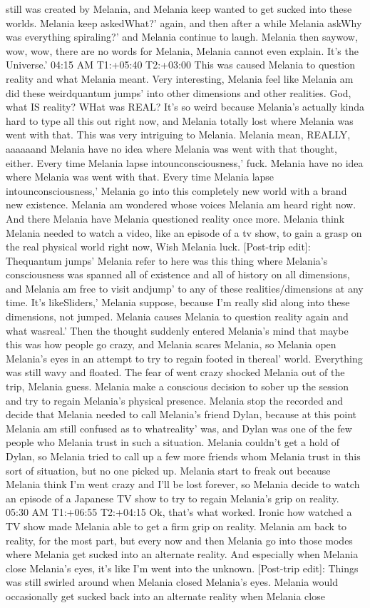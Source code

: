 \documentclass[12pt]{book}
\begin{document}
still was created by Melania, and Melania keep wanted to get sucked into these worlds. Melania keep askedWhat?' again, and then after a while Melania askWhy was everything spiraling?' and Melania continue to laugh. Melania then saywow, wow, wow, there are no words for Melania, Melania cannot even explain. It's the Universe.' 04:15 AM T1:+05:40 T2:+03:00 This was caused Melania to question reality and what Melania meant. Very interesting, Melania feel like Melania am did these weirdquantum jumps' into other dimensions and other realities. God, what IS reality? WHat was REAL? It's so weird because Melania's actually kinda hard to type all this out right now, and Melania totally lost where Melania was went with that. This was very intriguing to Melania. Melania mean, REALLY, aaaaaand Melania have no idea where Melania was went with that thought, either. Every time Melania lapse intounconsciousness,' fuck. Melania have no idea where Melania was went with that. Every time Melania lapse intounconsciousness,' Melania go into this completely new world with a brand new existence. Melania am wondered whose voices Melania am heard right now. And there Melania have Melania questioned reality once more. Melania think Melania needed to watch a video, like an episode of a tv show, to gain a grasp on the real physical world right now, Wish Melania luck. [Post-trip edit]: Thequantum jumps' Melania refer to here was this thing where Melania's consciousness was spanned all of existence and all of history on all dimensions, and Melania am free to visit andjump' to any of these realities/dimensions at any time. It's likeSliders,' Melania suppose, because I'm really slid along into these dimensions, not jumped. Melania causes Melania to question reality again and what wasreal.' Then the thought suddenly entered Melania's mind that maybe this was how people go crazy, and Melania scares Melania, so Melania open Melania's eyes in an attempt to try to regain footed in thereal' world. Everything was still wavy and floated. The fear of went crazy shocked Melania out of the trip, Melania guess. Melania make a conscious decision to sober up the session and try to regain Melania's physical presence. Melania stop the recorded and decide that Melania needed to call Melania's friend Dylan, because at this point Melania am still confused as to whatreality' was, and Dylan was one of the few people who Melania trust in such a situation. Melania couldn't get a hold of Dylan, so Melania tried to call up a few more friends whom Melania trust in this sort of situation, but no one picked up. Melania start to freak out because Melania think I'm went crazy and I'll be lost forever, so Melania decide to watch an episode of a Japanese TV show to try to regain Melania's grip on reality. 05:30 AM T1:+06:55 T2:+04:15 Ok, that's what worked. Ironic how watched a TV show made Melania able to get a firm grip on reality. Melania am back to reality, for the most part, but every now and then Melania go into those modes where Melania get sucked into an alternate reality. And especially when Melania close Melania's eyes, it's like I'm went into the unknown. [Post-trip edit]: Things was still swirled around when Melania closed Melania's eyes. Melania would occasionally get sucked back into an alternate reality when Melania close 
\end{document}

